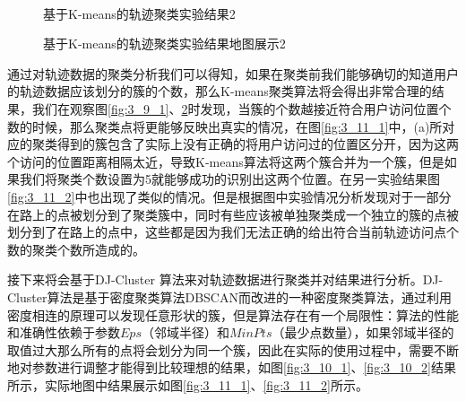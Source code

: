 \begin{figure}[htb]
  \centering%
  \\
  \caption{基于K-means的轨迹聚类实验结果2}
  \label{fig:3_8_2}
\end{figure}
\begin{figure}[htb]
  \centering%
  \caption{基于K-means的轨迹聚类实验结果地图展示2}
  \label{fig:3_9_2}
\end{figure}
\par 通过对轨迹数据的聚类分析我们可以得知，如果在聚类前我们能够确切的知道用户的轨迹数据应该划分的簇的个数，那么K-means聚类算法将会得出非常合理的结果，我们在观察图\ref{fig:3_9_1}、\ref{fig:3_9_2}时发现，当簇的个数越接近符合用户访问位置个数的时候，那么聚类点将更能够反映出真实的情况，在图\ref{fig:3_11_1}中，(a)所对应的聚类得到的簇包含了实际上没有正确的将用户访问过的位置区分开，因为这两个访问的位置距离相隔太近，导致K-means算法将这两个簇合并为一个簇，但是如果我们将聚类个数设置为5就能够成功的识别出这两个位置。在另一实验结果图\ref{fig:3_11_2}中也出现了类似的情况。但是根据图中实验情况分析发现对于一部分在路上的点被划分到了聚类簇中，同时有些应该被单独聚类成一个独立的簇的点被划分到了在路上的点中，这些都是因为我们无法正确的给出符合当前轨迹访问点个数的聚类个数所造成的。
\par 接下来将会基于DJ-Cluster 算法来对轨迹数据进行聚类并对结果进行分析。DJ-Cluster算法是基于密度聚类算法DBSCAN而改进的一种密度聚类算法，通过利用密度相连的原理可以发现任意形状的簇，但是算法存在有一个局限性：算法的性能和准确性依赖于参数$Eps$（邻域半径）和$MinPts$（最少点数量），如果邻域半径的取值过大那么所有的点将会划分为同一个簇，因此在实际的使用过程中，需要不断地对参数进行调整才能得到比较理想的结果，如图\ref{fig:3_10_1}、\ref{fig:3_10_2}结果所示，实际地图中结果展示如图\ref{fig:3_11_1}、\ref{fig:3_11_2}所示。
